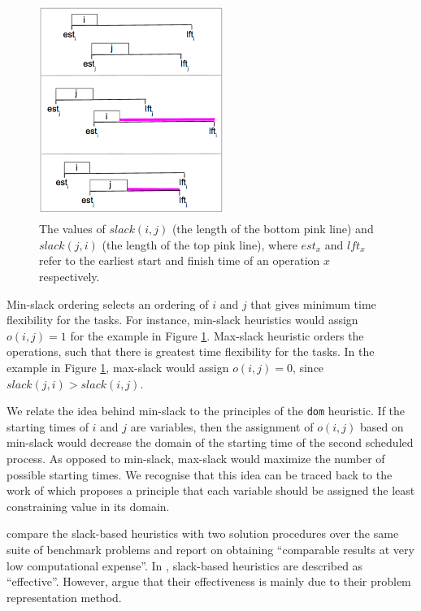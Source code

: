\documentclass{mprop}
\theoremstyle{definition}
\begin{document}
\begin{figure}[H]
\centering
\includegraphics[height=7cm, width=6cm]{images/slack.png}
\caption{The values of $slack(i, j)$ (the length of the bottom pink line) and $slack(j, i)$ (the length of the top pink line), where $est_{x}$ and $lft_{x}$ refer to the earliest start and finish time of an operation $x$ respectively.}
\label{fig:slack}
\end{figure}

Min-slack ordering selects an ordering of $i$ and $j$ that gives minimum time flexibility for the tasks. For instance, min-slack heuristics would assign $o(i,j) = 1$ for the example in Figure \ref{fig:slack}.
Max-slack heuristic orders the operations, such that there is greatest time flexibility for the tasks. In the example in Figure \ref{fig:slack}, max-slack would assign $o(i,j) = 0$, since $slack(j, i) > slack(i, j)$.

We relate the idea behind min-slack to the principles of the \texttt{dom} heuristic. If the starting times of $i$ and $j$ are variables, then the assignment of $o(i,j)$ based on min-slack would decrease the domain of the starting time of the second scheduled process. As opposed to min-slack, max-slack would maximize the number of possible starting times. We recognise that this idea can be traced back to the work of \citet{Geelen92} which proposes a principle that each variable should be assigned the least constraining value in its domain.

\citet{Smith93} compare the slack-based heuristics with two solution procedures over the same suite of benchmark problems and report on obtaining ``comparable results at very low computational expense''. In \citet[p.~105]{cpbible}, slack-based heuristics are described as ``effective''. However, \citet{Crawford94} argue that their effectiveness is mainly due to their problem representation method.
\end{document}

